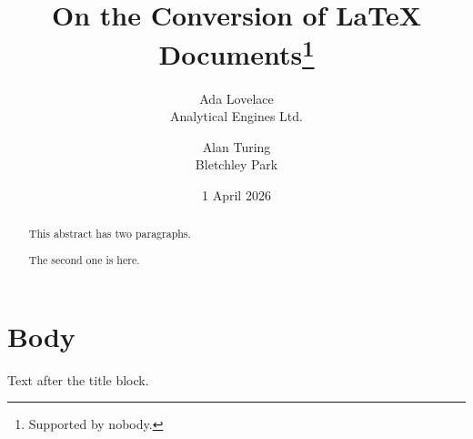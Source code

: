 \documentclass[12pt]{article}
\title{On the Conversion of \LaTeX{} Documents\thanks{Supported by nobody.}}
\author{Ada Lovelace\\Analytical Engines Ltd. \and Alan Turing\\Bletchley Park}
\date{1 April 2026}
\begin{document}
\maketitle
\begin{abstract}
This abstract has two paragraphs.

The second one is here.
\end{abstract}
\section{Body}
Text after the title block.
\end{document}
